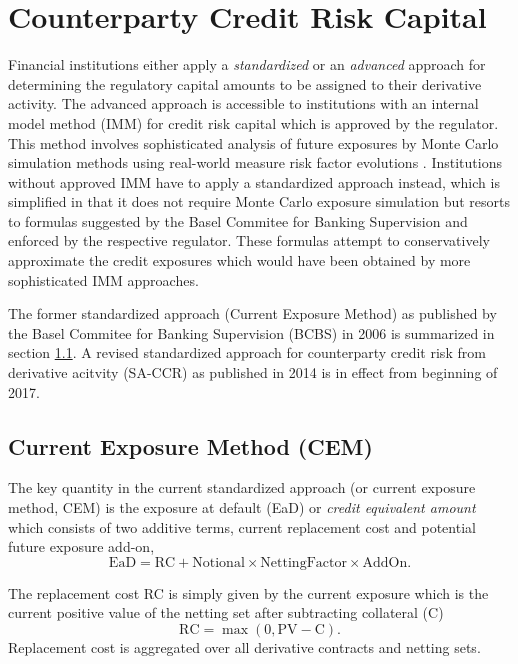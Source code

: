 \section{Counterparty Credit Risk Capital}

Financial institutions either apply a {\em standardized} or an {\em advanced}
approach for determining the regulatory capital amounts to be assigned
to their derivative activity. The advanced approach is
accessible to institutions with an internal model method (IMM) for
credit risk capital which is approved by the regulator. This method
involves sophisticated analysis of future exposures by Monte Carlo
simulation methods using real-world measure risk factor evolutions \cite{Lichters}.
Institutions without approved IMM have to apply a standardized approach instead, which is
simplified in that it does not require Monte Carlo exposure simulation
but resorts to formulas suggested by the Basel Commitee for Banking
Supervision and enforced by the respective regulator. These formulas
attempt to conservatively approximate the credit exposures which would
have been obtained by more sophisticated IMM approaches.

The former standardized approach (Current Exposure Method) as published by the Basel Commitee for
Banking Supervision (BCBS) in 2006 \cite{bcbs128} is summarized in section \ref{sec_cem}. 
A revised standardized approach for counterparty credit risk from
derivative acitvity (SA-CCR) as published in 2014 \cite{bcbs279} is in
effect from beginning of 2017.

\subsection{Current Exposure Method (CEM)}\label{sec_cem}

The key quantity in the current standardized approach (or current
exposure method, CEM) is the exposure at default (EaD) or {\em
  credit equivalent amount} which consists of two additive terms,
current replacement cost and potential future exposure add-on, 
$$ 
\text{EaD} = \text{RC} + \text{Notional} \times \text{NettingFactor} \times \text{AddOn}. 
$$

The replacement cost RC is simply given by the current exposure
which is the current positive value of the netting set after subtracting
collateral (C) 
$$
\text{RC} = \max(0, \text{PV} - \text{C}).
$$
Replacement cost is aggregated over all derivative contracts and
netting sets.

